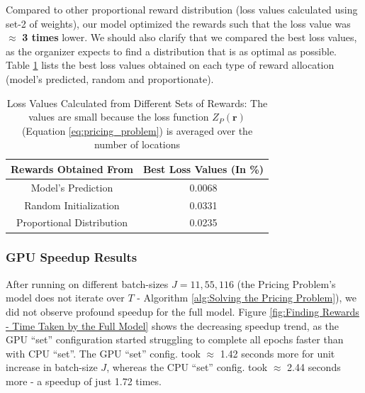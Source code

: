 \documentclass[12pt]{article}
\newcommand{\vect}[1]{\mathbf{#1}}  %
\begin{document}
    Compared to other proportional reward distribution (loss values calculated using set-2 of weights), our model optimized the rewards such that the loss value was $\approx$ \textbf{3 times} lower. We should also clarify that we compared the best loss values, as the organizer expects to find a distribution that is as optimal as possible. Table \ref{tab:Loss Values Calculated from Different Sets of Rewards} lists the best loss values obtained on each type of reward allocation (model's predicted, random and proportionate).
    \begin{table}[!htbp]
        \centering
        \caption[Loss Values Calculated from Different Sets of Rewards]{Loss Values Calculated from Different Sets of Rewards: The values are small because the loss function $Z_P(\vect{r})$ (Equation \ref{eq:pricing_problem}) is averaged over the number of locations}
        \label{tab:Loss Values Calculated from Different Sets of Rewards}
        \begin{tabular}{|c|c|}
            \hline
            \textbf{Rewards Obtained From} & \textbf{Best Loss Values (In \%)}\\
            \hline
            Model's Prediction & 0.0068\\
            Random Initialization & 0.0331\\
            Proportional Distribution & 0.0235\\
            \hline
        \end{tabular}
    \end{table}
    
    \subsubsection{GPU Speedup Results} \label{sec:PriProbRes - GPU}
    After running on different batch-sizes $J = 11, 55, 116$ (the Pricing Problem's model does not iterate over $T$ - Algorithm \ref{alg:Solving the Pricing Problem}), we did not observe profound speedup for the full model. Figure \ref{fig:Finding Rewards - Time Taken by the Full Model} shows the decreasing speedup trend, as the GPU ``set'' configuration started struggling to complete all epochs faster than with CPU ``set''. The GPU ``set'' config. took $\approx$ 1.42 seconds more for unit increase in batch-size $J$, whereas the CPU ``set'' config. took $\approx$ 2.44 seconds more - a speedup of just 1.72 times.
    
\end{document}
